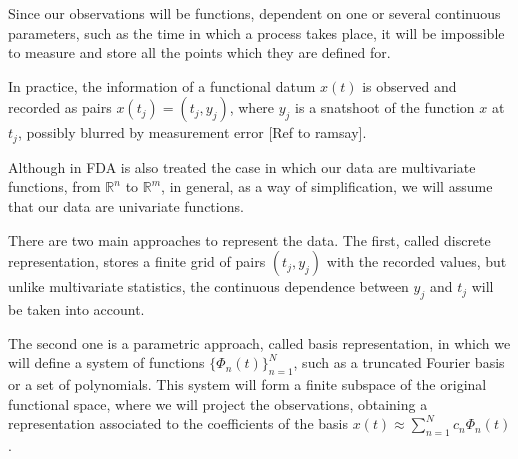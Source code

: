 Since our observations will be functions, dependent on one or several continuous
parameters, such as the time in which a process takes place, it will be
impossible to measure and store all the points which they are defined for.

In practice, the information of a functional datum $x(t)$ is observed and
recorded as pairs $x(t_j) = (t_j, y_j)$, where $y_j$ is a snatshoot of the
function $x$ at $t_j$, possibly blurred by measurement error [Ref to ramsay].

Although in FDA is also treated the case in which our data are multivariate
functions, from  $\mathbb{R}^n$ to $\mathbb{R}^m$, in general, as a way of
simplification, we will assume that our data are univariate functions.

There are two main approaches to represent the data. The first, called discrete
representation, stores a finite grid of pairs $(t_j, y_j)$ with the recorded
values, but unlike multivariate statistics, the continuous dependence between
$y_j$ and $t_j$ will be taken into account.

The second one is a parametric approach, called basis representation, in which
we will define a system of functions $\{\Phi_n(t) \}_{n=1}^N$, such as a
truncated Fourier basis or a set of polynomials. This system will form a finite
subspace of the original functional space, where we will project the
observations, obtaining a representation associated to the coefficients of
the basis $x(t) \approx \sum_{n=1}^N c_n\Phi_n(t)$.
